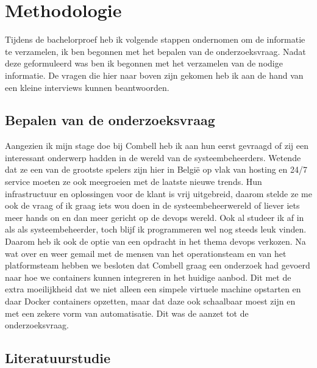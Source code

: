 
\chapter{Methodologie}
\label{ch:methodologie}

Tijdens de bachelorproef heb ik volgende stappen ondernomen om de informatie te verzamelen, ik ben begonnen met het bepalen van de onderzoeksvraag. Nadat deze geformuleerd was ben ik begonnen met het verzamelen van de nodige informatie. De vragen die hier naar boven zijn gekomen heb ik aan de hand van een kleine interviews kunnen beantwoorden.

\section{Bepalen van de onderzoeksvraag}

Aangezien ik mijn stage doe bij Combell heb ik aan hun eerst gevraagd of zij een interessant onderwerp hadden in de wereld van de systeembeheerders. Wetende dat ze een van de grootste spelers zijn hier in België op vlak van hosting en 24/7 service moeten ze ook meegroeien met de laatste nieuwe trends. Hun infrastructuur en oplossingen voor de klant is vrij uitgebreid, daarom stelde ze me ook de vraag of ik graag iets wou doen in de systeembeheerwereld of liever iets meer hands on en dan meer gericht op de devops wereld. Ook al studeer ik af in als als systeembeheerder, toch blijf ik programmeren wel nog steeds leuk vinden. Daarom heb ik ook de optie van een opdracht in het thema devops verkozen. Na wat over en weer gemail met de mensen van het operationsteam en van het platformsteam hebben we besloten dat Combell graag een onderzoek had gevoerd naar hoe we containers kunnen integreren in het huidige aanbod. Dit met de extra moeilijkheid dat we niet alleen een simpele virtuele machine opstarten en daar Docker containers opzetten, maar dat daze ook schaalbaar moest zijn en met een zekere vorm van automatisatie. Dit was de aanzet tot de onderzoeksvraag.

\section{Literatuurstudie}

